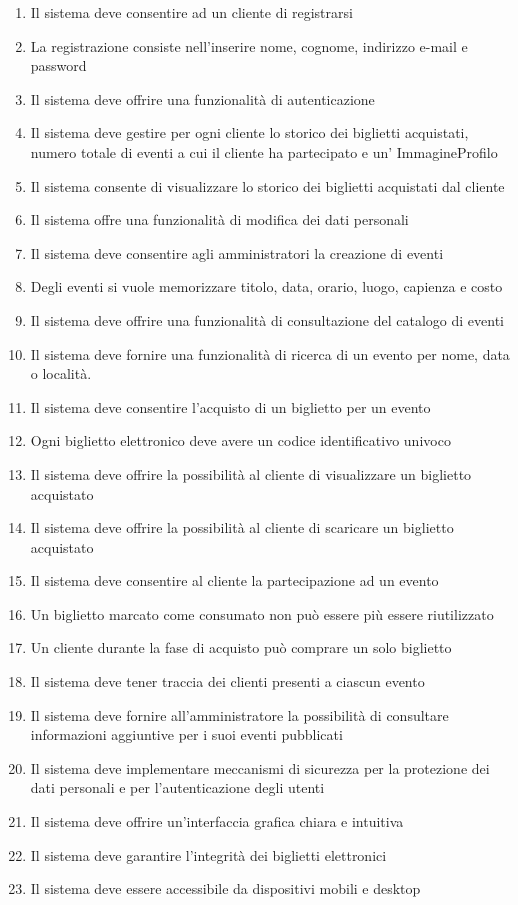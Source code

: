 \begin{enumerate}[]
    \item Il sistema deve consentire ad un cliente di registrarsi
    \item La registrazione consiste nell’inserire nome, cognome, indirizzo e-mail e password
    \item Il sistema deve offrire una funzionalità di autenticazione
    \item Il sistema deve gestire per ogni cliente lo storico dei biglietti acquistati, numero totale di eventi a cui il cliente ha partecipato e un' ImmagineProfilo
    \item Il sistema consente di visualizzare lo storico dei biglietti acquistati dal cliente
    \item Il sistema offre una funzionalità di modifica dei dati personali
    \item Il sistema deve consentire agli amministratori la creazione di eventi
    \item Degli eventi si vuole memorizzare titolo, data, orario, luogo, capienza e costo
    \item Il sistema deve offrire una funzionalità di consultazione del catalogo di eventi
    \item Il sistema deve fornire una funzionalità di ricerca di un evento per nome, data o località.
    \item Il sistema deve consentire l’acquisto di un biglietto per un evento
    \item Ogni biglietto elettronico deve avere un codice identificativo univoco
    \item Il sistema deve offrire la possibilità al cliente di visualizzare un biglietto acquistato
    \item Il sistema deve offrire la possibilità al cliente di scaricare un biglietto acquistato
    \item Il sistema deve consentire al cliente la partecipazione ad un evento
    \item Un biglietto marcato come consumato non può essere più essere riutilizzato
    \item Un cliente durante la fase di acquisto può comprare un solo biglietto
    \item Il sistema deve tener traccia dei clienti presenti a ciascun evento
    \item Il sistema deve fornire all'amministratore la possibilità di consultare informazioni aggiuntive per i suoi eventi pubblicati
    \item Il sistema deve implementare meccanismi di sicurezza per la protezione dei dati personali e per l’autenticazione degli utenti
    \item Il sistema deve offrire un’interfaccia grafica chiara e intuitiva
    \item Il sistema deve garantire l’integrità dei biglietti elettronici
    \item Il sistema deve essere accessibile da dispositivi mobili e desktop
\end{enumerate}

